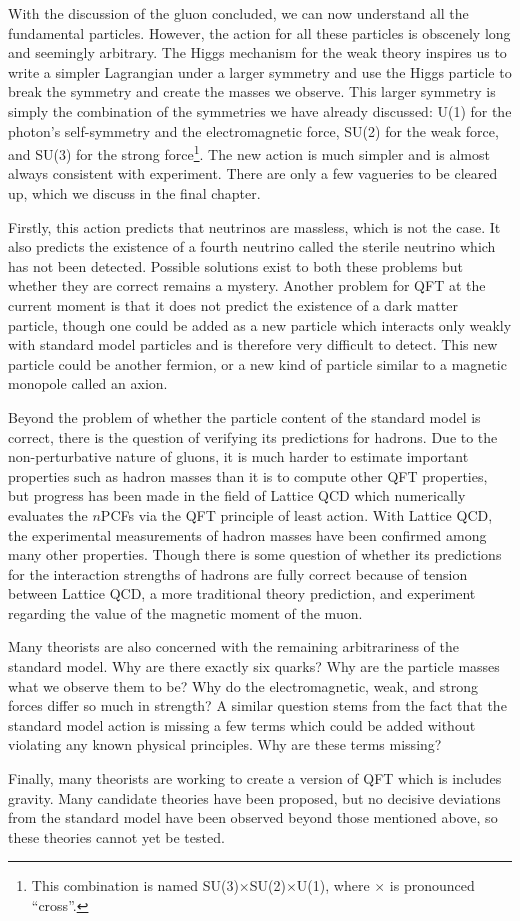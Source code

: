 With the discussion of the gluon concluded, we can now understand all the fundamental particles. However, the action for all these particles is obscenely long and seemingly arbitrary. The Higgs mechanism for the weak theory inspires us to write a simpler Lagrangian under a larger symmetry and use the Higgs particle to break the symmetry and create the masses we observe. This larger symmetry is simply the combination of the symmetries we have already discussed: U(1) for the photon's self-symmetry and the electromagnetic force, SU(2) for the weak force, and SU(3) for the strong force\footnote{This combination is named SU(3)$\times$SU(2)$\times$U(1), where $\times$ is pronounced ``cross''.}. The new action is much simpler and is almost always consistent with experiment. There are only a few vagueries to be cleared up, which we discuss in the final chapter.

Firstly, this action predicts that neutrinos are massless, which is not the case. It also predicts the existence of a fourth neutrino called the sterile neutrino which has not been detected. Possible solutions exist to both these problems but whether they are correct remains a mystery. Another problem for QFT at the current moment is that it does not predict the existence of a dark matter particle, though one could be added as a new particle which interacts only weakly with standard model particles and is therefore very difficult to detect. This new particle could be another fermion, or a new kind of particle similar to a magnetic monopole called an axion.

Beyond the problem of whether the particle content of the standard model is correct, there is the question of verifying its predictions for hadrons. Due to the non-perturbative nature of gluons, it is much harder to estimate important properties such as hadron masses than it is to compute other QFT properties, but progress has been made in the field of Lattice QCD which numerically evaluates the $n$PCFs via the QFT principle of least action. With Lattice QCD, the experimental measurements of hadron masses have been confirmed among many other properties. Though there is some question of whether its predictions for the interaction strengths of hadrons are fully correct because of tension between Lattice QCD, a more traditional theory prediction, and experiment regarding the value of the magnetic moment of the muon.

Many theorists are also concerned with the remaining arbitrariness of the standard model. Why are there exactly six quarks? Why are the particle masses what we observe them to be? Why do the electromagnetic, weak, and strong forces differ so much in strength? A similar question stems from the fact that the standard model action is missing a few terms which could be added without violating any known physical principles. Why are these terms missing?

Finally, many theorists are working to create a version of QFT which is includes gravity. Many candidate theories have been proposed, but no decisive deviations from the standard model have been observed beyond those mentioned above, so these theories cannot yet be tested.
